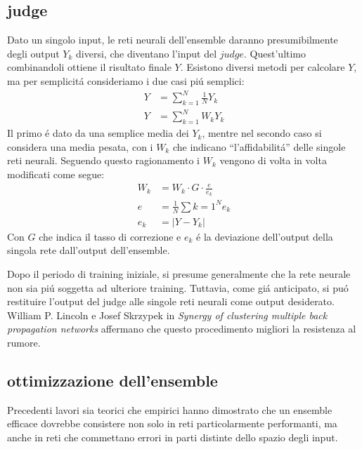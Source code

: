 \documentclass[a4paper,12pt]{report}
\begin{document}
 \subsection{judge}
 
 Dato un singolo input, le reti neurali dell'ensemble daranno presumibilmente degli output $Y_k$ diversi, che diventano l'input del $judge$. Quest'ultimo combinandoli ottiene il risultato finale $Y$. 
 Esistono diversi metodi per calcolare $Y$, ma per semplicit\'a consideriamo i due casi pi\'u semplici:
 \begin{align}
  Y &= \sum_{k=1}^N \frac{1}{N} Y_k \\
  Y &= \sum_{k=1}^N W_k Y_k
 \end{align}
 Il primo \'e dato da una semplice media dei $Y_k$, mentre nel secondo caso si considera una media pesata, con i $W_k$ che indicano ``l'affidabilit\'a'' delle singole reti neurali. 
 Seguendo questo ragionamento i $W_k$ vengono di volta in volta modificati come segue:
 \begin{align}
  W_k &= W_k \cdot G \cdot \frac{e}{e_k} \label{JudgeWeights} \\
  e &= \frac{1}{N} \sum{k=1}^N e_k \\
  e_k &= \left | Y - Y_k \right |
 \end{align}
 Con $G$ che indica il tasso di correzione e $e_k$ \'e la deviazione dell'output della singola rete dall'output dell'ensemble.
 
 Dopo il periodo di training iniziale, si presume generalmente che la rete neurale non sia pi\'u soggetta ad ulteriore training. 
 Tuttavia, come gi\'a anticipato, si pu\'o restituire l'output del judge alle singole reti neurali come output desiderato. 
 William P. Lincoln e Josef Skrzypek in \textit{Synergy of clustering multiple back propagation networks} affermano che questo procedimento migliori la resistenza al rumore.
  
 \subsection{ottimizzazione dell'ensemble}
 Precedenti lavori sia teorici \cite{hansen1990neural} \cite{krogh1995neural} che empirici \cite{hashem1994optimal} \cite{maclin1995combining} hanno dimostrato che un ensemble efficace dovrebbe consistere non solo in reti particolarmente performanti, ma anche in reti che commettano errori in parti distinte dello spazio degli input. 
 
\end{document}
